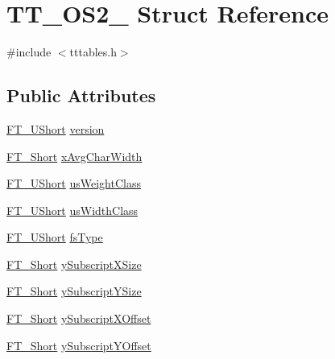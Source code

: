 \hypertarget{struct_t_t___o_s2__}{}\section{T\+T\+\_\+\+O\+S2\+\_\+ Struct Reference}
\label{struct_t_t___o_s2__}


{\ttfamily \#include $<$tttables.\+h$>$}

\subsection*{Public Attributes}
\begin{DoxyCompactItemize}
\item 
\mbox{\hyperlink{fttypes_8h_a937f6c17cf5ffd09086d8610c37b9f58}{F\+T\+\_\+\+U\+Short}} \mbox{\hyperlink{struct_t_t___o_s2___a012ff79224cd25ae51837ca8937605c4}{version}}
\item 
\mbox{\hyperlink{fttypes_8h_aa7279be89046a2563cd3d4d6651fbdcf}{F\+T\+\_\+\+Short}} \mbox{\hyperlink{struct_t_t___o_s2___af903883918479780d17a72f6fee992bd}{x\+Avg\+Char\+Width}}
\item 
\mbox{\hyperlink{fttypes_8h_a937f6c17cf5ffd09086d8610c37b9f58}{F\+T\+\_\+\+U\+Short}} \mbox{\hyperlink{struct_t_t___o_s2___af4d8ab32a27382ea95b882d9e2615ec9}{us\+Weight\+Class}}
\item 
\mbox{\hyperlink{fttypes_8h_a937f6c17cf5ffd09086d8610c37b9f58}{F\+T\+\_\+\+U\+Short}} \mbox{\hyperlink{struct_t_t___o_s2___a8ef38b9f9c65a65aa6abf92e19236146}{us\+Width\+Class}}
\item 
\mbox{\hyperlink{fttypes_8h_a937f6c17cf5ffd09086d8610c37b9f58}{F\+T\+\_\+\+U\+Short}} \mbox{\hyperlink{struct_t_t___o_s2___ad7e436778424fe4dbe53ca8bd2a975c7}{fs\+Type}}
\item 
\mbox{\hyperlink{fttypes_8h_aa7279be89046a2563cd3d4d6651fbdcf}{F\+T\+\_\+\+Short}} \mbox{\hyperlink{struct_t_t___o_s2___a3ae8d803a5055564e9f8a3926200e39c}{y\+Subscript\+X\+Size}}
\item 
\mbox{\hyperlink{fttypes_8h_aa7279be89046a2563cd3d4d6651fbdcf}{F\+T\+\_\+\+Short}} \mbox{\hyperlink{struct_t_t___o_s2___afb1b8ed1ea98badd4de58ff47b54c4c2}{y\+Subscript\+Y\+Size}}
\item 
\mbox{\hyperlink{fttypes_8h_aa7279be89046a2563cd3d4d6651fbdcf}{F\+T\+\_\+\+Short}} \mbox{\hyperlink{struct_t_t___o_s2___ab471c53b6e8a1c1f81cc410959bb5851}{y\+Subscript\+X\+Offset}}
\item 
\mbox{\hyperlink{fttypes_8h_aa7279be89046a2563cd3d4d6651fbdcf}{F\+T\+\_\+\+Short}} \mbox{\hyperlink{struct_t_t___o_s2___a94902b1f33ded0ea4c0555d54a0750fa}{y\+Subscript\+Y\+Offset}}

\end{DoxyCompactItemize}
